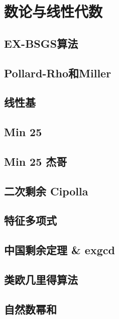 \documentclass[a4paper,12pt]{article}
\begin{document}
\section{数论与线性代数}

\subsection{EX-BSGS算法}

\subsection{Pollard-Rho和Miller}

\subsection{线性基}



\subsection{Min 25}

\subsection{Min 25 杰哥}

\subsection{二次剩余 Cipolla}

\subsection{特征多项式}

\subsection{中国剩余定理 \& exgcd}

\subsection{类欧几里得算法}

\subsection{自然数幂和}

\end{document}
